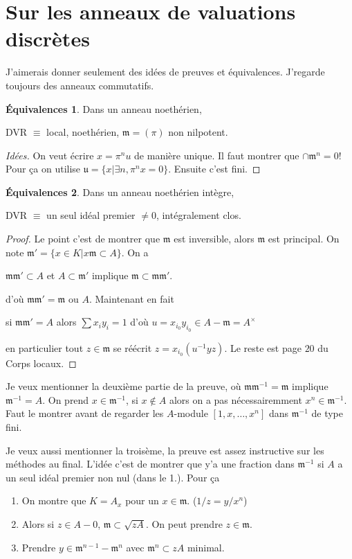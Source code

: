 \documentclass[a4paper,12pt]{book}
\newcommand{\m}{\mathfrak m}
\theoremstyle{plain}
\theoremstyle{definition}
\newtheorem*{eq}{Équivalences}
\theoremstyle{remark}
\begin{document}
\section{Sur les anneaux de valuations discrètes}
J'aimerais donner seulement des idées de preuves et équivalences.
J'regarde toujours des anneaux commutatifs.

\begin{eq}
    Dans un anneau noethérien, 
    \begin{center}
	DVR $\equiv$ local, noethérien, $\m=(\pi)$ non nilpotent.
    \end{center}
\end{eq}
\begin{proof}[Idées]
    On veut écrire $x=\pi^n u$ de manière unique. Il faut montrer que
    $\cap \m^n = 0$! Pour ça on utilise $\mathfrak u = \{x|\exists n, \pi^n x=0\}$. Ensuite c'est fini.
\end{proof}

\begin{eq}
    Dans un anneau noethérien intègre, 
    \begin{center}
	DVR $\equiv$ un seul idéal premier $\ne 0$, intégralement clos.
    \end{center}
\end{eq}
\begin{proof}
    Le point c'est de montrer que $\m$ est inversible, alors $\m$ est
    principal. On note $\m'=\{x\in K|x\m\subset A\}$. On a 
    \begin{center}
	$\m\m'\subset A$ et $A\subset \m'$ implique $\m\subset \m\m'$.
    \end{center}
    d'où $\m\m'=\m$ ou $A$.
    Maintenant en fait
    \begin{center}
	si $\m\m'=A$ alors $\sum x_iy_i=1$ d'où 
	$u=x_{i_0}y_{i_0}\in A-\m=A^{\times}$ 
    \end{center}
    en particulier tout 
    $z\in\m$ se réécrit $z=x_{i_0}(u^{-1}yz)$.
    Le reste est page $20$ du Corps locaux.
\end{proof}
Je veux mentionner la deuxième partie de la preuve, où $\m\m^{-1}=\m$
implique $\m^{-1}=A$. On prend $x\in \m^{-1}$, si $x\notin A$ alors on
a pas nécessairemment $x^n\in \m^{-1}$. Faut le montrer avant de regarder
les $A$-module $[1,x,\ldots,x^n]$ dans $\m^{-1}$ de type fini.

Je veux aussi mentionner la troisème, la preuve est assez instructive
sur les méthodes au final. L'idée c'est de montrer que y'a une fraction
dans $\m^{-1}$ si $A$ a un seul idéal premier non nul (dans le 1.).
Pour ça
\begin{enumerate}
    \item On montre que $K=A_x$ pour un $x\in \m$. ($1/z=y/x^n$)
    \item Alors si $z\in A-0$, $\m\subset\sqrt{zA}$. On peut prendre
	$z\in \m$.
    \item Prendre $y\in\m^{n-1}-\m^n$ avec $\m^n\subset zA$ minimal.
\end{enumerate}
\end{document}

